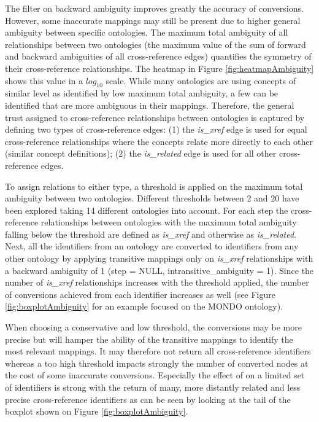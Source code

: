 \documentclass[9pt,a4paper,]{extarticle}
\begin{document}
The filter on backward ambiguity improves greatly the accuracy of conversions. However, some inaccurate mappings may still be present due to higher general ambiguity between specific ontologies. The maximum total ambiguity of all relationships between two ontologies (the maximum value of the sum of forward and backward ambiguities of all cross-reference edges) quantifies the symmetry of their cross-reference relationships. The heatmap in Figure \ref{fig:heatmapAmbiguity} shows this value in a \(log_{10}\) scale. While many ontologies are using concepts of similar level as identified by low maximum total ambiguity, a few can be identified that are more ambiguous in their mappings. Therefore, the general trust assigned to cross-reference relationships between ontologies is captured by defining two types of cross-reference edges: (1) the \emph{is\_xref} edge is used for equal cross-reference relationships where the concepts relate more directly to each other (similar concept definitions); (2) the \emph{is\_related} edge is used for all other cross-reference edges.

To assign relations to either type, a threshold is applied on the maximum total ambiguity between two ontologies. Different thresholds between 2 and 20 have been explored taking 14 different ontologies into account. For each step the cross-reference relationships between ontologies with the maximum total ambiguity falling below the threshold are defined as \emph{is\_xref} and otherwise as \emph{is\_related}. Next, all the identifiers from an ontology are converted to identifiers from any other ontology by applying transitive mappings only on \emph{is\_xref} relationships with a backward ambiguity of 1 (step = NULL, intransitive\_ambiguity = 1). Since the number of \emph{is\_xref} relationships increases with the threshold applied, the number of conversions achieved from each identifier increases as well (see Figure \ref{fig:boxplotAmbiguity} for an example focused on the MONDO ontology).

When choosing a conservative and low threshold, the conversions may be more precise but will hamper the ability of the transitive mappings to identify the most relevant mappings. It may therefore not return all cross-reference identifiers whereas a too high threshold impacts strongly the number of converted nodes at the cost of some inaccurate conversions. Especially the effect of on a limited set of identifiers is strong with the return of many, more distantly related and less precise cross-reference identifiers as can be seen by looking at the tail of the boxplot shown on Figure \ref{fig:boxplotAmbiguity}.
\end{document}
